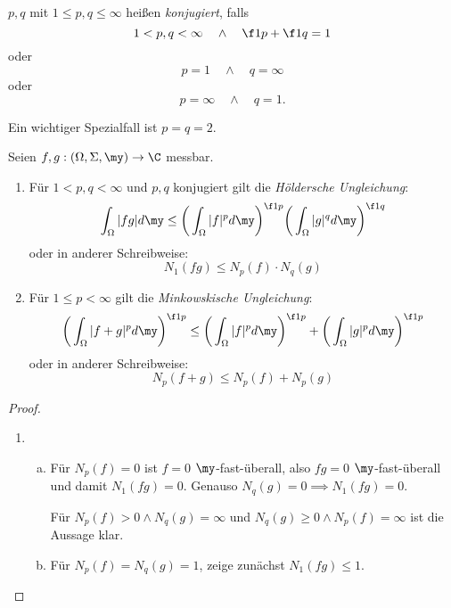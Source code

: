 \begin{df} \label{2.6}
	$p,q$ mit $1 \le p,q \le \infty$ heißen \emph{konjugiert}, falls
	\[
		1 < p, q < \infty \quad\land\quad \f 1p + \f 1q = 1
	\]
	oder
	\[
		p = 1 \quad\land\quad q = \infty
	\]
	oder
	\[
		p = \infty \quad\land\quad q = 1.
	\]
	\begin{note}
		Ein wichtiger Spezialfall ist $p=q=2$.
	\end{note}
\end{df}


\begin{st} \label{2.7}
	Seien $f,g : (\Omega, \Sigma, \my) \to \C$ messbar.
	\begin{enumerate}[1)]
		\item
			Für $1 < p,q < \infty$ und $p,q$ konjugiert gilt die \emph{Höldersche Ungleichung}:
			\[
				\int_{\Omega} |fg| d\my \le \bigg(\int_{\Omega}|f|^p d\my \bigg)^{\f 1p} \bigg( \int_{\Omega} |g|^q d\my \bigg)^{\f 1q}
			\]
			oder in anderer Schreibweise:
			\[
				N_1(fg) \le N_p(f) \cdot N_q(g)
			\]
		\item
			Für $1 \le p < \infty$ gilt die \emph{Minkowskische Ungleichung}:
			\[
				\bigg( \int_{\Omega} |f+g|^p d\my \bigg)^{\f 1p} \le  \bigg(\int_{\Omega} |f|^p d\my\bigg)^{\f 1p} + \bigg( \int_{\Omega} |g|^p d\my \bigg)^{\f 1p}
			\]
			oder in anderer Schreibweise:
			\[
				N_p(f+g) \le N_p(f) + N_p(g)
			\]
	\end{enumerate}
	\begin{proof}
		\begin{enumerate}[1)]
			\item
				\begin{enumerate}[a)]
					\item
						Für $N_p(f) = 0$ ist $f =0 $ $\my$-fast-überall, also $fg = 0$ $\my$-fast-überall und damit $N_1(fg) = 0$.
						Genauso $N_q(g) = 0 \implies N_1(fg) = 0$.

						Für $N_p(f) > 0 \land N_q(g) = \infty$ und $N_q(g) \ge 0 \land N_p(f) = \infty$ ist die Aussage klar.
					\item
						Für $N_p(f) = N_q(g) = 1$, zeige zunächst $N_1(fg) \le 1$.


\end{enumerate}
\end{enumerate}
\end{proof}
\end{st}
